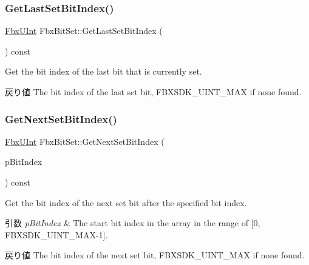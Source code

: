 \subsubsection{\texorpdfstring{Get\+Last\+Set\+Bit\+Index()}{GetLastSetBitIndex()}}
{\footnotesize\ttfamily \hyperlink{fbxtypes_8h_ae9fb141d8158a730aa85ec5ff2ea3f6b}{Fbx\+U\+Int} Fbx\+Bit\+Set\+::\+Get\+Last\+Set\+Bit\+Index (\begin{DoxyParamCaption}{ }\end{DoxyParamCaption}) const}

Get the bit index of the last bit that is currently set. \begin{DoxyReturn}{戻り値}
The bit index of the last set bit, F\+B\+X\+S\+D\+K\+\_\+\+U\+I\+N\+T\+\_\+\+M\+AX if none found. 
\end{DoxyReturn}
\mbox{\label{class_fbx_bit_set_a95f7f4e88d181f4ce61cc24bef217cc4}} 
\subsubsection{\texorpdfstring{Get\+Next\+Set\+Bit\+Index()}{GetNextSetBitIndex()}}
{\footnotesize\ttfamily \hyperlink{fbxtypes_8h_ae9fb141d8158a730aa85ec5ff2ea3f6b}{Fbx\+U\+Int} Fbx\+Bit\+Set\+::\+Get\+Next\+Set\+Bit\+Index (\begin{DoxyParamCaption}\item[{const \hyperlink{fbxtypes_8h_ae9fb141d8158a730aa85ec5ff2ea3f6b}{Fbx\+U\+Int}}]{p\+Bit\+Index }\end{DoxyParamCaption}) const}

Get the bit index of the next set bit after the specified bit index. 
\begin{DoxyParams}{引数}
{\em p\+Bit\+Index} & The start bit index in the array in the range of \mbox{[}0, F\+B\+X\+S\+D\+K\+\_\+\+U\+I\+N\+T\+\_\+\+M\+A\+X-\/1\mbox{]}. \\
\hline
\end{DoxyParams}
\begin{DoxyReturn}{戻り値}
The bit index of the next set bit, F\+B\+X\+S\+D\+K\+\_\+\+U\+I\+N\+T\+\_\+\+M\+AX if none found. 
\end{DoxyReturn}
\mbox{\label{class_fbx_bit_set_a4a254f2f2906494c4c23452f03a1c399}} 
